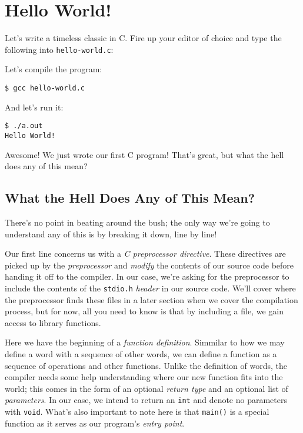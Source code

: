 %

\chapter{Hello World!}

Let's write a timeless classic in C.  Fire up your editor of choice and
type the following into \texttt{hello-world.c}:


\noindent
Let's compile the program:
\begin{verbatim}
$ gcc hello-world.c
\end{verbatim}
And let's run it:
\begin{verbatim}
$ ./a.out
Hello World!
\end{verbatim}
Awesome!  We just wrote our first C program!  That’s great, but what the
hell does any of this mean?

\section{What the Hell Does Any of This Mean?}

There's no point in beating around the bush; the only way we're going to
understand any of this is by breaking it down, line by line!


\noindent
Our first line concerns us with a \emph{C preprocessor directive}. These
directives are picked up by the \emph{preprocessor} and \emph{modify}
the contents of our source code before handing it off to the compiler.
In our case, we're asking for the preprocessor to include the contents
of the \texttt{stdio.h} \emph{header} in our source code.  We'll
cover where the preprocessor finds these files in a later section when
we cover the compilation process, but for now, all you need to know is
that by including a file, we gain access to library functions.


\noindent
Here we have the beginning of a \emph{function definition}.  Simmilar to
how we may define a word with a sequence of other words, we can define a
function as a sequence of operations and other functions.  Unlike the
definition of words, the compiler needs some help understanding where
our new function fits into the world; this comes in the form of an
optional \emph{return type} and an optional list of \emph{parameters}.
In our case, we intend to return an \texttt{int} and denote no
parameters with \texttt{void}.  What's also important to note
here is that \texttt{main()} is a special function as it serves
as our program's \emph{entry point}.

